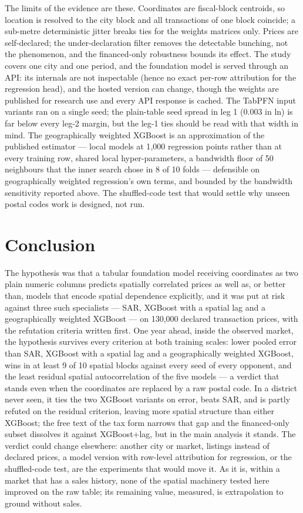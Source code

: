 \documentclass[11pt,a4paper]{article}
\begin{document}
The limits of the evidence are these. Coordinates are fiscal-block centroids, so location is
resolved to the city block and all transactions of one block coincide; a sub-metre deterministic
jitter breaks ties for the weights matrices only. Prices are self-declared; the
under-declaration filter removes the detectable bunching, not the phenomenon, and the
financed-only robustness bounds its effect. The study covers one city and one period, and the
foundation model is served through an API: its internals are not inspectable (hence no exact
per-row attribution for the regression head), and the hosted version can change, though the
weights are published for research use and every API response is cached. The TabPFN input
variants ran on a single seed; the plain-table seed spread in leg 1 ($0.003$ in ln) is far below
every leg-2 margin, but the leg-1 ties should be read with that width in mind. The
geographically weighted XGBoost is an approximation of the published estimator --- local models
at 1{,}000 regression points rather than at every training row, shared local hyper-parameters,
a bandwidth floor of 50 neighbours that the inner search chose in 8 of 10 folds --- defensible
on geographically weighted regression's own terms, and bounded by the bandwidth sensitivity
reported above. The shuffled-code test that would settle why unseen postal codes work is
designed, not run.

\section{Conclusion}
\label{sec:conclusion}

The hypothesis was that a tabular foundation model receiving coordinates as two plain numeric
columns predicts spatially correlated prices as well as, or better than, models that encode
spatial dependence explicitly, and it was put at risk against three such specialists --- SAR,
XGBoost with a spatial lag and a geographically weighted XGBoost --- on 130{,}000 declared
transaction prices, with the refutation criteria written first. One year ahead, inside
the observed market, the hypothesis survives every criterion at both training scales: lower
pooled error than SAR, XGBoost with a spatial lag and a geographically weighted XGBoost, wins
in at least 9 of 10 spatial blocks against every seed of every opponent, and the least residual
spatial autocorrelation of the five models --- a verdict that stands even when the coordinates
are replaced by a raw postal code. In a district never seen, it ties the two XGBoost variants on
error, beats SAR, and is partly refuted on the residual criterion, leaving more spatial
structure than either XGBoost; the free text of the tax form narrows that gap and the
financed-only subset dissolves it against XGBoost+lag, but in the main analysis it stands. The
verdict could change elsewhere: another city or market, listings instead of declared prices, a
model version with row-level attribution for regression, or the shuffled-code test, are the
experiments that would move it. As it is, within a market that has a sales history,
none of the spatial machinery tested here improved on the raw table; its remaining value,
measured, is extrapolation to ground without sales.
\end{document}
